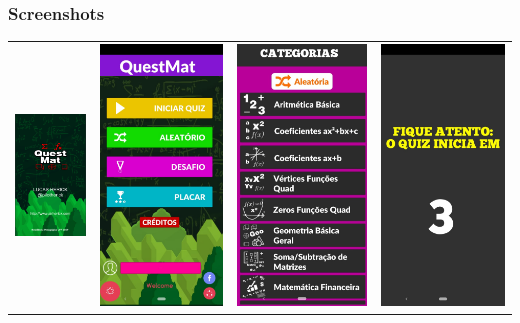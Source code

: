 \documentclass[10pt]{beamer}
\begin{document}

\begin{frame}
\frametitle{Screenshots}
\begin{tabular}{cccc}
	\includegraphics[width=0.22\linewidth]{QuestMat_splash.PNG} &
	\includegraphics[width=0.22\linewidth]{menu_quest.jpeg} &
	\includegraphics[width=0.22\linewidth]{quiz_selection.jpeg} &  
	\includegraphics[width=0.22\linewidth]{timer_quest.jpeg}
\end{tabular} 




\end{frame}
\end{document}

